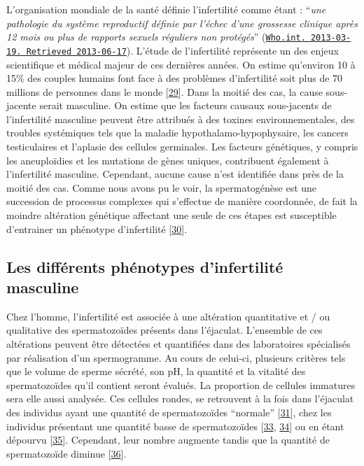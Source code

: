 \documentclass[12pt,twoside]{reedthesis}
\theoremstyle{definition}
\theoremstyle{definition}
\theoremstyle{remark}
\begin{document}
  L'organisation mondiale de la santé définie l'infertilité comme étant :
  ``\emph{une pathologie du système reproductif définie par l'échec d'une
  grossesse clinique après 12 mois ou plus de rapports sexuels réguliers
  non protégés}''
  (\href{http://www.who.int/reproductivehealth/topics/infertility/definitions/en/}{\texttt{Who.int.\ 2013-03-19.\ Retrieved\ 2013-06-17}}).
  L'étude de l'infertilité représente un des enjeux scientifique et
  médical majeur de ces dernières années. On estime qu'environ 10 à 15\%
  des couples humains font face à des problèmes d'infertilité soit plus de
  70 millions de personnes dans le monde
  {[}\protect\hyperlink{ref-Boivin2007a}{29}{]}. Dans la moitié des cas,
  la cause sous-jacente serait masculine. On estime que les facteurs
  causaux sous-jacents de l'infertilité masculine peuvent être attribués à
  des toxines environnementales, des troubles systémiques tels que la
  maladie hypothalamo-hypophysaire, les cancers testiculaires et l'aplasie
  des cellules germinales. Les facteurs génétiques, y compris les
  aneuploïdies et les mutations de gènes uniques, contribuent également à
  l'infertilité masculine. Cependant, aucune cause n'est identifiée dans
  près de la moitié des cas. Comme nous avons pu le voir, la
  spermatogénèse est une succession de processus complexes qui s'effectue
  de manière coordonnée, de fait la moindre altération génétique affectant
  une seule de ces étapes est susceptible d'entrainer un phénotype
  d'infertilité {[}\protect\hyperlink{ref-Grudzinskas1995}{30}{]}.
  
  \subsection{Les différents phénotypes d'infertilité
  masculine}\label{les-differents-phenotypes-dinfertilite-masculine}
  
  Chez l'homme, l'infertilité est associée à une altération quantitative
  et / ou qualitative des spermatozoïdes présents dans l'éjaculat.
  L'ensemble de ces altérations peuvent être détectées et quantifiées dans
  des laboratoires spécialisés par réalisation d'un spermogramme. Au cours
  de celui-ci, plusieurs critères tels que le volume de sperme sécrété,
  son pH, la quantité et la vitalité des spermatozoïdes qu'il contient
  seront évalués. La proportion de cellules immatures sera elle aussi
  analysée. Ces cellules rondes, se retrouvent à la fois dans l'éjaculat
  des individus ayant une quantité de spermatozoïdes ``normale''
  {[}\protect\hyperlink{ref-Michael1937}{31}{]}, chez les individus
  présentant une quantité basse de spermatozoïdes
  {[}\protect\hyperlink{ref-MacLeod1970}{33},
  \protect\hyperlink{ref-Tomlinson1993}{34}{]} ou en étant dépourvu
  {[}\protect\hyperlink{ref-Kurilo}{35}{]}. Cependant, leur nombre
  augmente tandis que la quantité de spermatozoïde diminue
  {[}\protect\hyperlink{ref-SPERLING1971}{36}{]}.
  
\end{document}
